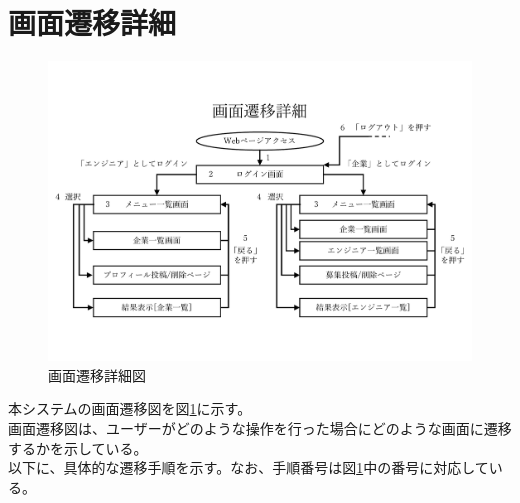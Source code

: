 \documentclass[10pt]{ltjsarticle}
\begin{document}
\section{画面遷移詳細}
\begin{figure}[H]
    \centering
    \includegraphics[trim=0.5cm 3cm 0.5cm 4.1cm, clip, width=16cm]{./img/screen_transition.pdf}
    \caption{画面遷移詳細図}
    \label{fig:flow}
\end{figure}
\vspace{-.5cm}

本システムの画面遷移図を図\ref{fig:flow}に示す。\\
\indent 画面遷移図は、ユーザーがどのような操作を行った場合にどのような画面に遷移するかを示している。\\
\indent 以下に、具体的な遷移手順を示す。なお、手順番号は図\ref{fig:flow}中の番号に対応している。\\
\end{document}
